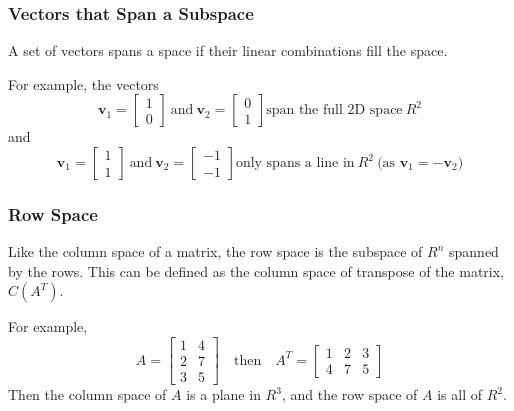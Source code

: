         \subsubsection{Vectors that Span a Subspace}
            A set of vectors spans a space if their linear combinations fill the space.
            
            \par \hfill \break
            For example, the vectors 
            \begin{equation}
                \boldsymbol{v}_1 = 
                \begin{bmatrix} 
                    1 \\ 0 
                \end{bmatrix} 
                \ \textrm{and} \ \boldsymbol{v}_2 = 
                \begin{bmatrix} 
                    0 \\ 1 
                \end{bmatrix} 
                \textrm{span the full 2D space} \ R^2
            \end{equation}
            and
            \begin{equation}
                \boldsymbol{v}_1 = 
                \begin{bmatrix} 
                    1 \\ 1 
                \end{bmatrix} 
                \ \textrm{and} \ \boldsymbol{v}_2 = 
                \begin{bmatrix} 
                    -1 \\ -1 
                \end{bmatrix} 
                \textrm{only spans a line in} \ R^2 \ \textrm{(as \(\boldsymbol{v}_1 = -\boldsymbol{v}_2\))}
            \end{equation}

        \subsubsection{Row Space}
            Like the column space of a matrix, the row space is the subspace of \(R^n\) spanned by the rows. This can 
            be defined as the column space of transpose of the matrix, \(C(A^T)\).

            \par \hfill \break
            For example,
            \begin{equation}
                A = \begin{bmatrix} 1 & 4 \\ 2 & 7 \\ 3 & 5 \end{bmatrix}
                \quad \textrm{then} \quad
                A^T = \begin{bmatrix} 1 & 2 & 3 \\ 4 & 7 & 5 \end{bmatrix}
            \end{equation}
            Then the column space of \(A\) is a plane in \(R^3\), and the row space of \(A\) is all of \(R^2\).

